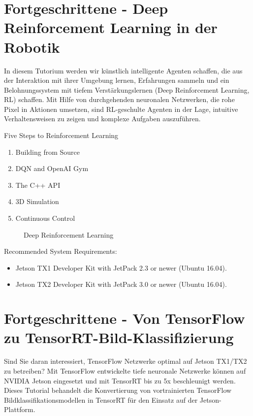 {\section{Fortgeschrittene - Deep Reinforcement Learning in der Robotik}


In diesem Tutorium werden wir künstlich intelligente Agenten schaffen, die aus der Interaktion mit ihrer Umgebung lernen, Erfahrungen sammeln und ein Belohnungssystem mit tiefem Verstärkungslernen (Deep Reinforcement Learning, RL) schaffen. Mit Hilfe von durchgehenden neuronalen Netzwerken, die rohe Pixel in Aktionen umsetzen, sind RL-geschulte Agenten in der Lage, intuitive Verhaltensweisen zu zeigen und komplexe Aufgaben auszuführen.


Five Steps to Reinforcement Learning

\begin{enumerate}
  \item Building from Source
  \item DQN and OpenAI Gym
  \item The C++ API
  \item 3D Simulation
  \item Continuous Control
\end{enumerate}

\begin{figure}
	
	\caption{Deep Reinforcement Learning}
	
\end{figure}



Recommended System Requirements:
\begin{itemize}
  \item Jetson TX1 Developer Kit with JetPack 2.3 or newer (Ubuntu 16.04).
  \item Jetson TX2 Developer Kit with JetPack 3.0 or newer (Ubuntu 16.04).
\end{itemize}


\section{Fortgeschrittene - Von TensorFlow zu TensorRT-Bild-Klassifizierung}


Sind Sie daran interessiert, TensorFlow Netzwerke optimal auf Jetson TX1/TX2 zu betreiben? Mit TensorFlow entwickelte tiefe neuronale Netzwerke können auf NVIDIA Jetson eingesetzt und mit TensorRT bis zu 5x beschleunigt werden. Dieses Tutorial behandelt die Konvertierung von vortrainierten TensorFlow Bildklassifikationsmodellen in TensorRT für den Einsatz auf der Jetson-Plattform.


}
